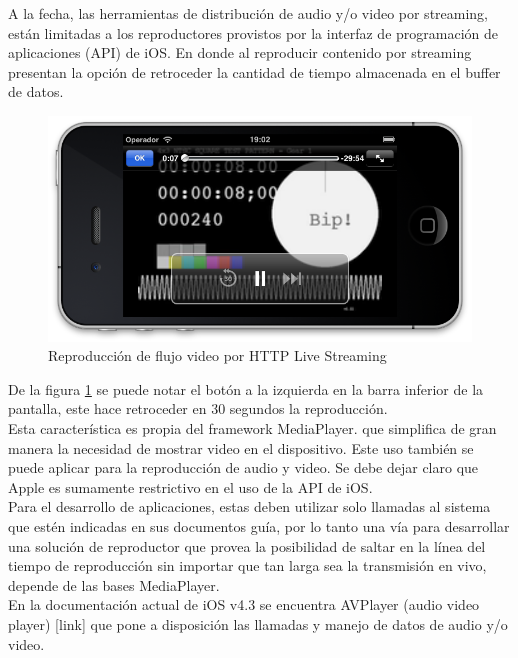A la fecha, las herramientas de distribución de audio y/o video por streaming, están limitadas a los reproductores provistos por la interfaz de programación de aplicaciones (API) de iOS. En donde al reproducir contenido por streaming presentan la opción de retroceder la cantidad de  tiempo almacenada en el buffer de datos. \\

\begin{figure}[h!]
	\centering
	\includegraphics[scale=0.55]{imgs/sshot_iOS_hls.png}
	\caption{Reproducción de flujo video por HTTP Live Streaming}
	\label{sshot_iOS_hls}	
\end{figure}

De la figura \ref{sshot_iOS_hls} se puede notar el botón a la izquierda en la barra inferior de  la pantalla, este hace retroceder en 30 segundos la reproducción.\\

Esta característica es propia del framework MediaPlayer. que simplifica de gran manera la necesidad de mostrar video en el dispositivo. Este uso también se puede aplicar para la reproducción  de  audio y video.
Se debe dejar claro que Apple es sumamente restrictivo en el uso de la API de iOS. \\
Para el desarrollo de aplicaciones, estas deben utilizar solo llamadas al sistema que estén indicadas en sus documentos guía, por lo tanto una vía para desarrollar una solución de reproductor que provea la posibilidad de saltar en la línea del tiempo de reproducción sin importar que tan larga sea la transmisión en vivo, depende de las bases MediaPlayer. \\

En la documentación actual de iOS v4.3 se encuentra AVPlayer (audio video player) [link] que pone a disposición las llamadas y manejo de datos de audio y/o video.


